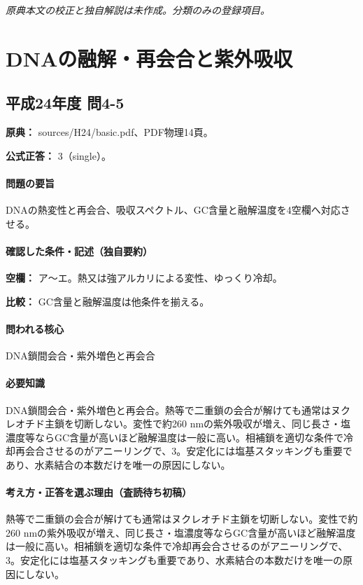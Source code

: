 \par\textit{原典本文の校正と独自解説は未作成。分類のみの登録項目。}

\section{DNAの融解・再会合と紫外吸収}

\subsection{平成24年度 問4-5}
\label{q:h24-reg-basic-4-5}

\noindent\textbf{原典：} sources/H24/basic.pdf、PDF物理14頁。

\textbf{公式正答：} 3（single）。

\paragraph{問題の要旨} DNAの熱変性と再会合、吸収スペクトル、GC含量と融解温度を4空欄へ対応させる。

\paragraph{確認した条件・記述（独自要約）}\mbox{}\par

\noindent\textbf{空欄：} ア〜エ。熱又は強アルカリによる変性、ゆっくり冷却。\par

\noindent\textbf{比較：} GC含量と融解温度は他条件を揃える。\par

\paragraph{問われる核心} DNA鎖間会合・紫外増色と再会合

\paragraph{必要知識} DNA鎖間会合・紫外増色と再会合。熱等で二重鎖の会合が解けても通常はヌクレオチド主鎖を切断しない。変性で約260 nmの紫外吸収が増え、同じ長さ・塩濃度等ならGC含量が高いほど融解温度は一般に高い。相補鎖を適切な条件で冷却再会合させるのがアニーリングで、3。安定化には塩基スタッキングも重要であり、水素結合の本数だけを唯一の原因にしない。

\paragraph{考え方・正答を選ぶ理由（査読待ち初稿）} 熱等で二重鎖の会合が解けても通常はヌクレオチド主鎖を切断しない。変性で約260 nmの紫外吸収が増え、同じ長さ・塩濃度等ならGC含量が高いほど融解温度は一般に高い。相補鎖を適切な条件で冷却再会合させるのがアニーリングで、3。安定化には塩基スタッキングも重要であり、水素結合の本数だけを唯一の原因にしない。

